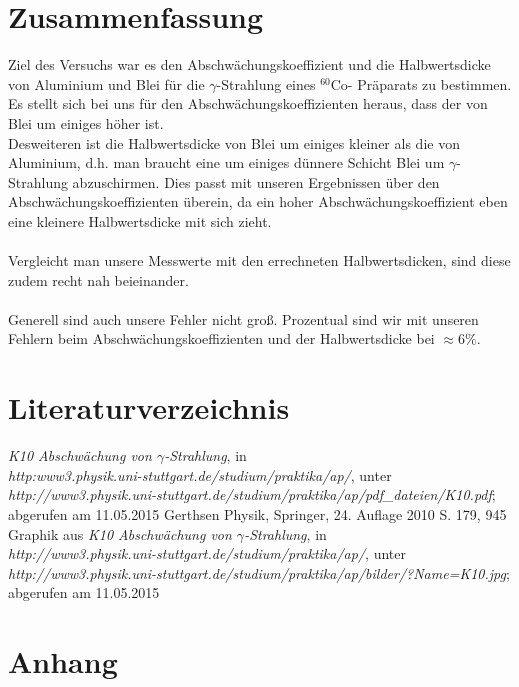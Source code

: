 \documentclass[fontsize=12pt]{scrartcl}
\begin{document}
\section{Zusammenfassung}
Ziel des Versuchs war es den Abschwächungskoeffizient und die Halbwertsdicke von Aluminium und Blei für die $\gamma$-Strahlung eines $^{60}$Co-
Präparats zu bestimmen. Es stellt sich bei uns für den Abschwächungskoeffizienten heraus, dass der von Blei um einiges höher ist.
~\\
Desweiteren ist die Halbwertsdicke von Blei um einiges kleiner als die von Aluminium, d.h. man braucht eine um einiges dünnere Schicht Blei um $\gamma$-Strahlung abzuschirmen. Dies passt mit unseren Ergebnissen über den Abschwächungskoeffizienten überein, da ein hoher Abschwächungskoeffizient eben eine kleinere Halbwertsdicke mit sich zieht.\\
~\\
Vergleicht man unsere Messwerte mit den errechneten Halbwertsdicken, sind diese zudem recht nah beieinander. \\
~\\
Generell sind auch unsere Fehler nicht groß. Prozentual sind wir mit unseren Fehlern beim Abschwächungskoeffizienten und der Halbwertsdicke bei $\approx 6\%$.
\newpage
         
\section{Literaturverzeichnis}
 \renewcommand\refname{~}
 \vspace{-25pt}

\begin{thebibliography}{xxx}
		\glqq \textit{K10 Abschwächung  von $\gamma$-Strahlung}\grqq, in\\
						\textit{http:www3.physik.uni-stuttgart.de/studium/praktika/ap/}, unter\\
						\textit{http://www3.physik.uni-stuttgart.de/studium/praktika/ap/pdf\_dateien/K10.pdf}; \\
						abgerufen am 11.05.2015
		Gerthsen Physik, Springer, 24. Auflage 2010 S. 179, 945
		Graphik aus \glqq \textit{K10 Abschwächung  von $\gamma$-Strahlung}\grqq, in\\
						\textit{http://www3.physik.uni-stuttgart.de/studium/praktika/ap/}, unter \\
						\textit{http://www3.physik.uni-stuttgart.de/studium/praktika/ap/bilder/?Name=K10.jpg}; \\
						abgerufen am 11.05.2015


\end{thebibliography}

\section{Anhang}
\end{document}
